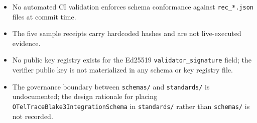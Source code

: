 \begin{itemize}
  \item[$\times$] No automated CI validation enforces schema conformance against \texttt{rec\_*.json}
    files at commit time.
  \item[$\times$] The five sample receipts carry hardcoded hashes and are not live-executed evidence.
  \item[$\times$] No public key registry exists for the Ed25519 \texttt{validator\_signature} field;
    the verifier public key is not materialized in any schema or key registry file.
  \item[$\times$] The governance boundary between \texttt{schemas/} and \texttt{standards/} is
    undocumented; the design rationale for placing \texttt{OTelTraceBlake3IntegrationSchema} in
    \texttt{standards/} rather than \texttt{schemas/} is not recorded.
\end{itemize}
